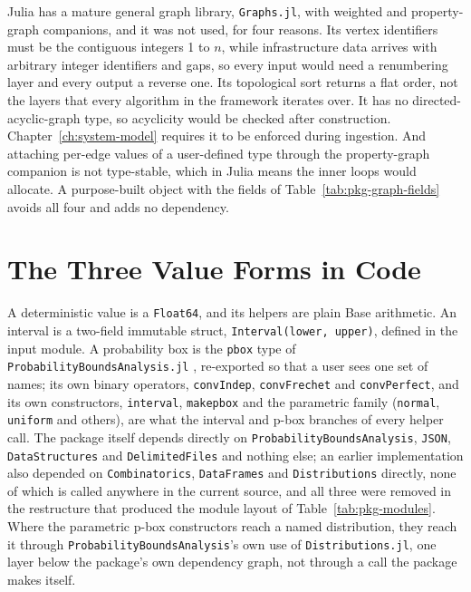 \documentclass[12pt]{report}
\begin{document}
Julia has a mature general graph library, \texttt{Graphs.jl}, with weighted and
property-graph companions, and it was not used, for four reasons. Its vertex identifiers
must be the contiguous integers 1 to $n$, while infrastructure data arrives with arbitrary
integer identifiers and gaps, so every input would need a renumbering layer and every output
a reverse one. Its topological sort returns a flat order, not the layers that every
algorithm in the framework iterates over. It has no directed-acyclic-graph type, so
acyclicity would be checked after construction. Chapter~\ref{ch:system-model} requires it
to be enforced during ingestion. And attaching per-edge values of a user-defined type
through the property-graph companion is not type-stable, which in Julia means the inner
loops would allocate. A purpose-built object with the fields of
Table~\ref{tab:pkg-graph-fields} avoids all four and adds no dependency.

\section{The Three Value Forms in Code}
\label{sec:pkg-values}

A deterministic value is a \texttt{Float64}, and its helpers are plain Base arithmetic. An
interval is a two-field immutable struct, \texttt{Interval(lower, upper)}, defined in the
input module. A probability box is the \texttt{pbox} type of
\texttt{ProbabilityBoundsAnalysis.jl} \cite{gray2021pbajulia}, re-exported so that a user
sees one set of names; its own binary operators, \texttt{convIndep}, \texttt{convFrechet}
and \texttt{convPerfect}, and its own constructors, \texttt{interval}, \texttt{makepbox} and
the parametric family (\texttt{normal}, \texttt{uniform} and others), are what the interval
and p-box branches of every helper call. The package itself depends directly on
\texttt{ProbabilityBoundsAnalysis}, \texttt{JSON},
\texttt{DataStructures} and \texttt{DelimitedFiles} and nothing else; an earlier
implementation also depended on \texttt{Combinatorics}, \texttt{DataFrames} and
\texttt{Distributions} directly, none of which is called anywhere in the current source, and
all three were removed in the restructure that produced the module layout of
Table~\ref{tab:pkg-modules}. Where the parametric p-box constructors reach a named
distribution, they reach it through \texttt{ProbabilityBoundsAnalysis}'s own use of
\texttt{Distributions.jl}, one layer below the package's own dependency graph, not through a
call the package makes itself.
\end{document}
